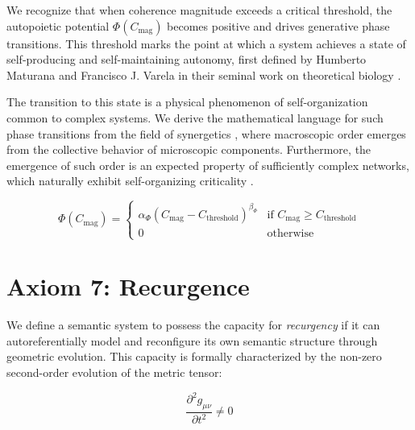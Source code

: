 We recognize that when coherence magnitude exceeds a critical threshold, the autopoietic potential \(\Phi(C_{\text{mag}})\) becomes positive and drives generative phase transitions. This threshold marks the point at which a system achieves a state of self-producing and self-maintaining autonomy, first defined by Humberto Maturana and Francisco J. Varela in their seminal work on theoretical biology \autocite{MaturanaVarela1980}.

The transition to this state is a physical phenomenon of self-organization common to complex systems. We derive the mathematical language for such phase transitions from the field of synergetics \autocite{Haken1983}, where macroscopic order emerges from the collective behavior of microscopic components. Furthermore, the emergence of such order is an expected property of sufficiently complex networks, which naturally exhibit self-organizing criticality \autocite{BakTangWiesenfeld1987}.

\begin{equation}
\Phi(C_{\text{mag}}) = \begin{cases}
\alpha_{\Phi} (C_{\text{mag}} - C_{\text{threshold}})^{\beta_{\Phi}} & \text{if } C_{\text{mag}} \geq C_{\text{threshold}} \\
0 & \text{otherwise}
\end{cases}
\end{equation}


\section{Axiom 7: Recurgence}
\label{1.7:axiom_7_recurgence}

We define a semantic system to possess the capacity for \textit{recurgency} if it can autoreferentially model and reconfigure its own semantic structure through geometric evolution. This capacity is formally characterized by the non-zero second-order evolution of the metric tensor:

\begin{equation}
\frac{\partial^2 g_{\mu\nu}}{\partial t^2} \neq 0
\end{equation} 